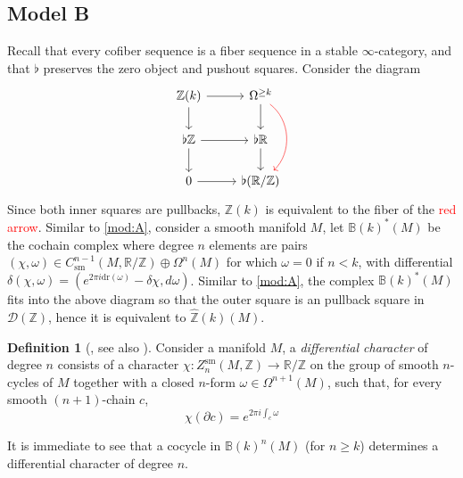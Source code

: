 \documentclass[a4paper]{book}
\newcommand{\bB}{\mathbb{B}}
\newcommand{\lD}{\mathcal{D}}
\newcommand{\bR}{\mathbb{R}}
\newcommand{\bZ}{\mathbb{Z}}
\newcommand{\sm}{\mathrm{sm}}
\theoremstyle{definition}
\newtheorem{definition}[equation]{Definition}
\theoremstyle{remark}
\numberwithin{equation}{section}
\begin{document}
\subsection{Model B}\label{mod:B} Recall that every cofiber sequence is a fiber sequence in a stable $\infty$-category, and that $\flat$ preserves the zero object and pushout squares. Consider the diagram
\[
  \begin{tikzcd}
    {\bZ}(k)\arrow[r]\arrow[d] & \Omega^{\geq k}\arrow[d]\arrow[dd,bend left=5em,color=red] \\
    \flat\bZ \arrow[r]\arrow[d] & \flat\bR\arrow[d] \\
    0\arrow[r] & \flat(\bR/\bZ)
  \end{tikzcd}
\]
Since both inner squares are pullbacks, ${\bZ}(k)$ is equivalent to the fiber of the \textcolor{red}{red arrow}. Similar to \cref{mod:A}, consider a smooth manifold $M$, let $\bB(k)^*(M)$ be the cochain complex where degree $n$ elements are pairs $(\chi,\omega)\in C_\sm^{n-1}(M,\bR/\bZ)\oplus\Omega^n(M)$ for which $\omega=0$ if $n<k$, with differential $\delta(\chi,\omega)=(e^{2\pi i\mathrm{dr}(\omega)}-\delta\chi,d\omega)$. Similar to \cref{mod:A}, the complex $\bB(k)^*(M)$ fits into the above diagram so that the outer square is an pullback square in $\lD(\bZ)$, hence it is equivalent to $\hat{\bZ}(k)(M)$.
\begin{definition}[{\cite[Definition 3.4]{hopkinssinger2005diffcoh}}, see also {\cite[Chapter 5]{barbecker2014diffchar}}] Consider a manifold $M$, a \emph{differential character} of degree $n$ consists of a character $\chi:Z^\sm_{n}(M,\bZ)\to\bR/\bZ$ on the group of smooth $n$-cycles of $M$ together with a closed $n$-form $\omega\in\Omega^{n+1}(M)$, such that, for every smooth $(n+1)$-chain $c$, \[\chi(\partial c)=e^{2\pi i\int_c\omega}\]
\end{definition}
It is immediate to see that a cocycle in $\bB(k)^n(M)$ (for $n\geq k$) determines a differential character of degree $n$. 
\end{document}
